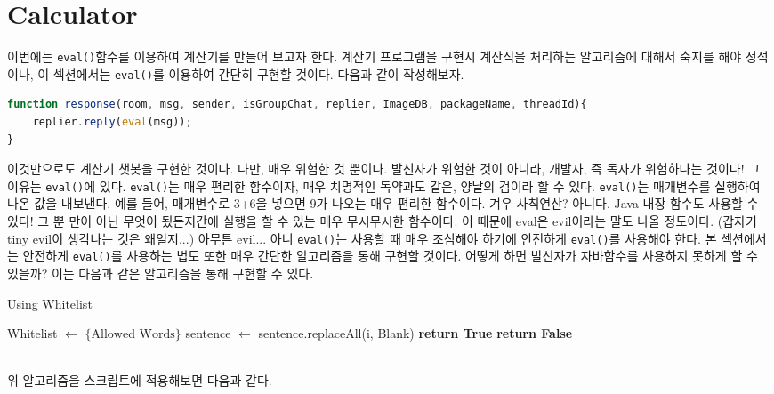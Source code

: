 \documentclass[10pt,a4paper,final]{book}
\begin{document}
\section{Calculator}
이번에는 \texttt{eval()}함수를 이용하여 계산기를 만들어 보고자 한다. 계산기 프로그램을 구현시 계산식을 처리하는 알고리즘에 대해서
숙지를 해야 정석이나, 이 섹션에서는 \texttt{eval()}를 이용하여 간단히 구현할 것이다. 다음과 같이 작성해보자.
\begin{lstlisting}[language=JavaScript,escapeinside=@@]
function response(room, msg, sender, isGroupChat, replier, ImageDB, packageName, threadId){
    replier.reply(eval(msg));
}
\end{lstlisting}
이것만으로도 계산기 챗봇을 구현한 것이다. 다만, 매우 위험한 것 뿐이다. 발신자가 위험한 것이 아니라,
개발자, 즉 독자가 위험하다는 것이다! 그 이유는 \texttt{eval()}에 있다. \texttt{eval()}는 매우 편리한 함수이자,
매우 치명적인 독약과도 같은, 양날의 검이라 할 수 있다.
\texttt{eval()}는 매개변수를 실행하여 나온 값을 내보낸다. 예를 들어, 매개변수로 3+6을 넣으면 9가 나오는 매우 편리한 함수이다.
겨우 사칙연산? 아니다. Java 내장 함수도 사용할 수 있다! 그 뿐 만이 아닌 무엇이 됬든지간에 실행을 할 수 있는 매우 무시무시한 함수이다.
이 때문에 eval은 evil이라는 말도 나올 정도이다. (갑자기 tiny evil이 생각나는 것은 왜일지...) 아무튼
evil... 아니 \texttt{eval()}는 사용할 때 매우 조심해야 하기에 안전하게 \texttt{eval()}를 사용해야 한다.
본 섹션에서는 안전하게 \texttt{eval()}를 사용하는 법도 또한 매우 간단한 알고리즘을 통해 구현할 것이다.
어떻게 하면 발신자가 자바함수를 사용하지 못하게 할 수 있을까? 이는 다음과 같은 알고리즘을 통해 구현할 수 있다.
\begin{algorithm}
        \caption{Using Whitelist}\label{euclid}
        \begin{algorithmic}[1]
                
            \State Whitelist $\gets $ $\{\text{Allowed Words}\}$
              
                \State sentence $\gets$ sentence.replaceAll(i, Blank)
            \EndFor
            	\State \textbf{return True}
            \Else
            	\State \textbf{return False}
            \EndIf
            \EndProcedure
        \end{algorithmic}
\end{algorithm}\\
위 알고리즘을 스크립트에 적용해보면 다음과 같다.
\end{document}
